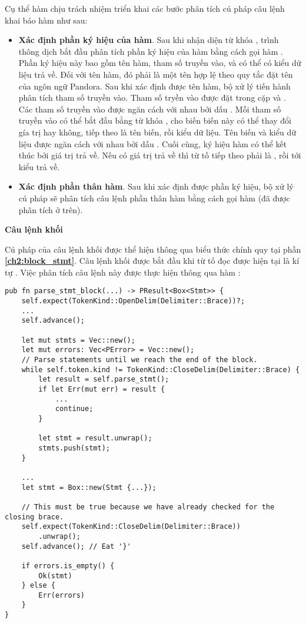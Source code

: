     Cụ thể hàm  chịu trách nhiệm triển khai các bước phân tích cú pháp câu lệnh khai báo hàm như sau:

\begin{itemize}
    \item \textbf{Xác định phần ký hiệu của hàm}. Sau khi nhận diện từ khóa , trình thông dịch bắt đầu phân tích phần ký hiệu của hàm bằng cách gọi hàm . Phần ký hiệu này bao gồm tên hàm, tham số truyền vào, và có thể có kiểu dữ liệu trả về. Đối với tên hàm, đó phải là một tên hợp lệ theo quy tắc đặt tên của ngôn ngữ Pandora. Sau khi xác định được tên hàm, bộ xử lý tiến hành phân tích tham số truyền vào. Tham số tryền vào được đặt trong cặp \kw{(} và \kw{)}. Các tham số truyền vào được ngăn cách với nhau bởi dấu \kw{,}. Mỗi tham số truyền vào có thể bắt đầu bằng từ khóa , cho biến biến này có thể thay đổi gía trị hay không, tiếp theo là tên biến, rồi kiểu dữ liệu. Tên biến và kiểu dữ liệu được ngăn cách với nhau bởi dấu \kw{:}. Cuối cùng, ký hiệu hàm có thể kết thúc bởi giá trị trả về. Nếu có giá trị trả về thì từ tố tiếp theo phải là \kw{->}, rồi tới kiểu trả về.
    \item \textbf{Xác định phần thân hàm}. Sau khi xác định được phần ký hiệu, bộ xử lý cú pháp sẽ phân tích câu lệnh phần thân hàm bằng cách gọi hàm  (đã được phân tích ở trên).
\end{itemize}

\noindent \textbf{Câu lệnh khối}

Cú pháp của câu lệnh khối được thể hiện thông qua biểu thức chính quy tại phần \textbf{\ref{ch2:block_stmt}}. Câu lệnh khối được bắt đầu khi từ tố đọc được hiện tại là kí tự \kw{\{}. Việc phân tích câu lệnh này được thực hiện thông qua hàm :
    
\begin{lstlisting}[]
pub fn parse_stmt_block(...) -> PResult<Box<Stmt>> {
    self.expect(TokenKind::OpenDelim(Delimiter::Brace))?;
    ...
    self.advance();

    let mut stmts = Vec::new();
    let mut errors: Vec<PError> = Vec::new();
    // Parse statements until we reach the end of the block.
    while self.token.kind != TokenKind::CloseDelim(Delimiter::Brace) {
        let result = self.parse_stmt();
        if let Err(mut err) = result {
            ...
            continue;
        }

        let stmt = result.unwrap();
        stmts.push(stmt);
    }

    ...
    let stmt = Box::new(Stmt {...});

    // This must be true because we have already checked for the closing brace.
    self.expect(TokenKind::CloseDelim(Delimiter::Brace))
        .unwrap();
    self.advance(); // Eat '}'

    if errors.is_empty() {
        Ok(stmt)
    } else {
        Err(errors)
    }
}
\end{lstlisting}

